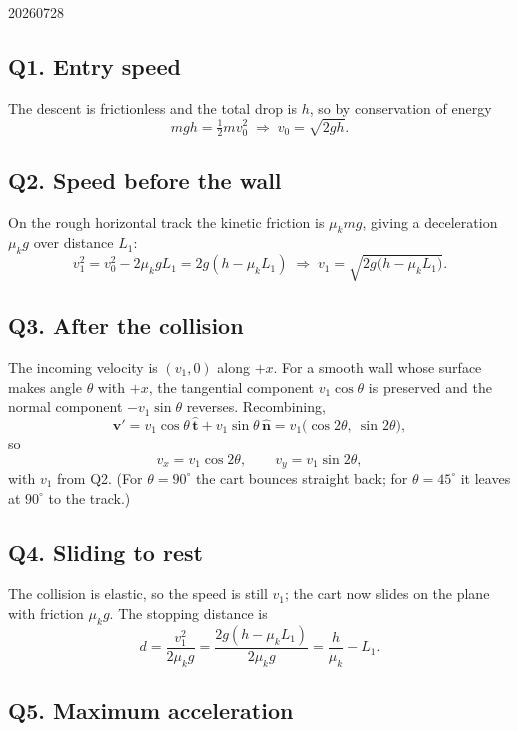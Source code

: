 \begin{solution}{20260728}

\subsection*{Q1. Entry speed}

The descent is frictionless and the total drop is $h$, so by conservation of energy
\[
  mgh = \tfrac12 m v_0^{2}
  \;\Longrightarrow\;
  \boxed{v_0 = \sqrt{2gh}}.
\]

\subsection*{Q2. Speed before the wall}

On the rough horizontal track the kinetic friction is $\mu_k m g$, giving a deceleration $\mu_k g$ over distance $L_1$:
\[
  v_1^{2} = v_0^{2} - 2\mu_k g L_1 = 2g(h - \mu_k L_1)
  \;\Longrightarrow\;
  \boxed{v_1 = \sqrt{2g\bigl(h - \mu_k L_1\bigr)}}.
\]

\subsection*{Q3. After the collision}

The incoming velocity is $(v_1, 0)$ along $+x$.  For a smooth wall whose surface makes angle $\theta$ with $+x$, the tangential component $v_1\cos\theta$ is preserved and the normal component $-v_1\sin\theta$ reverses.  Recombining,
\[
  \mathbf{v}' = v_1\cos\theta\,\hat{\mathbf{t}} + v_1\sin\theta\,\hat{\mathbf{n}}
              = v_1\bigl(\cos 2\theta,\ \sin 2\theta\bigr),
\]
so
\[
  \boxed{v_x = v_1\cos 2\theta, \qquad v_y = v_1\sin 2\theta},
\]
with $v_1$ from Q2.  (For $\theta = 90^{\circ}$ the cart bounces straight back; for $\theta = 45^{\circ}$ it leaves at $90^{\circ}$ to the track.)

\subsection*{Q4. Sliding to rest}

The collision is elastic, so the speed is still $v_1$; the cart now slides on the plane with friction $\mu_k g$.  The stopping distance is
\[
  d = \frac{v_1^{2}}{2\mu_k g}
    = \frac{2g(h - \mu_k L_1)}{2\mu_k g}
    = \boxed{\frac{h}{\mu_k} - L_1}.
\]

\subsection*{Q5. Maximum acceleration}


\end{solution}
